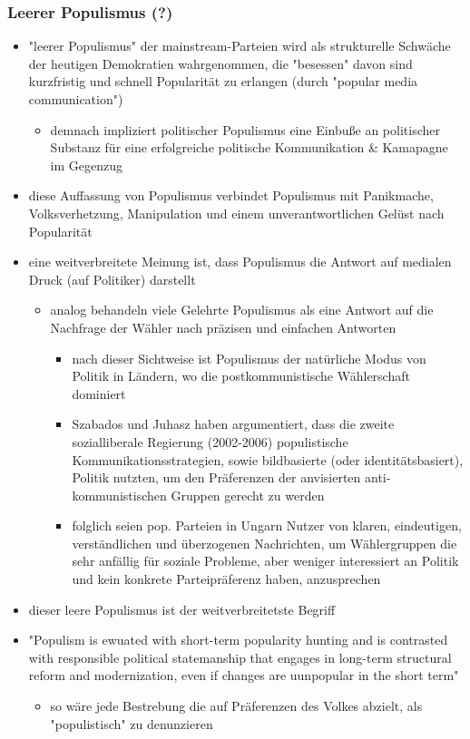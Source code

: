 \documentclass[11pt]{article}
\begin{document}
\subsubsection{Leerer Populismus (?)}
\label{sec:org2b8ee3c}
\begin{itemize}
\item "leerer Populismus" der mainstream-Parteien wird als strukturelle Schwäche der heutigen Demokratien wahrgenommen, die "besessen" davon sind kurzfristig und schnell Popularität zu erlangen (durch "popular media communication")
\begin{itemize}
\item demnach impliziert politischer Populismus eine Einbuße an politischer Substanz für eine erfolgreiche politische Kommunikation \& Kamapagne im Gegenzug
\end{itemize}
\item diese Auffassung von Populismus verbindet Populismus mit Panikmache, Volksverhetzung, Manipulation und einem unverantwortlichen Gelüst nach Popularität
\item eine weitverbreitete Meinung ist, dass Populismus die Antwort auf medialen Druck (auf Politiker) darstellt
\begin{itemize}
\item analog behandeln viele Gelehrte Populismus als eine Antwort auf die Nachfrage der Wähler nach präzisen und einfachen Antworten
\begin{itemize}
\item nach dieser Sichtweise ist Populismus der natürliche Modus von Politik in Ländern, wo die postkommunistische Wählerschaft dominiert
\item Szabados und Juhasz haben argumentiert, dass die zweite sozialliberale Regierung (2002-2006) populistische Kommunikationsstrategien, sowie bildbasierte (oder identitätsbasiert), Politik nutzten, um den Präferenzen der anvisierten anti-kommunistischen Gruppen gerecht zu werden
\item folglich seien pop. Parteien in Ungarn Nutzer von klaren, eindeutigen, verständlichen und überzogenen Nachrichten, um Wählergruppen die sehr anfällig für soziale Probleme, aber weniger interessiert an Politik und kein konkrete Parteipräferenz haben, anzusprechen
\end{itemize}
\end{itemize}
\item dieser leere Populismus ist der weitverbreitetste Begriff
\item "Populism is ewuated with short-term popularity hunting and is contrasted with responsible political statemanship that engages in long-term structural reform and modernization, even if changes are uunpopular in the short term"
\begin{itemize}
\item so wäre jede Bestrebung die auf Präferenzen des Volkes abzielt, als "populistisch" zu denunzieren
\end{itemize}
\end{itemize}
\end{document}
